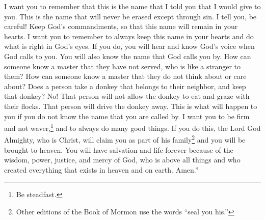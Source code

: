\bverse \iffalse And I would that ye should remember also, that this is the name that I said I should give unto you that never should be blotted out, except it be through transgression; therefore, take heed that ye do not transgress, that the name be not blotted out of your hearts. \fi
I want you to remember that this is the name that I told you that I would give to you. This is the name that will never be erased except through sin. I tell you, be careful! Keep God's commandments, so that this name will remain in your hearts.
\bverse \iffalse I say unto you, I would that ye should remember to retain the name written always in your hearts, that ye are not found on the left hand of God, but that ye hear and know the voice by which ye shall be called, and also, the name by which he shall call you. \fi
I want you to remember to always keep this name in your hearts and do what is right in God's eyes. If you do, you will hear and know God's voice when God calls to you. You will also know the name that God calls you by.
\bverse \iffalse For how knoweth a man the master whom he has not served, and who is a stranger unto him, and is far from the thoughts and intents of his heart? \fi
How can someone know a master that they have not served, who is like a stranger to them? How can someone know a master that they do not think about or care about?
\bverse \iffalse And again, doth a man take an ass which belongeth to his neighbor, and keep him? I say unto you, Nay; he will not even suffer that he shall feed among his flocks, but will drive him away, and cast him out. I say unto you, that even so shall it be among you if ye know not the name by which ye are called. \fi
Does a person take a donkey that belongs to their neighbor, and keep that donkey? No! That person will not allow the donkey to eat and graze with their flocks. That person will drive the donkey away. This is what will happen to you if you do not know the name that you are called by.
\bverse \iffalse Therefore, I would that ye should be steadfast and immovable, always abounding in good works, that Christ, the Lord God Omnipotent, may seal you his, that you may be brought to heaven, that ye may have everlasting salvation and eternal life, through the wisdom, and power, and justice, and mercy of him who created all things, in heaven and in earth, who is God above all. Amen. \fi
I want you to be firm and not waver,\footnote{Be steadfast.} and to always do many good things. If you do this, the Lord God Almighty, who is Christ, will claim you as part of his family\footnote{Other editions of the Book of Mormon use the words ``seal you his.''} and you will be brought to heaven. You will have salvation and life forever because of the wisdom, power, justice, and mercy of God, who is above all things and who created everything that exists in heaven and on earth. Amen.''

